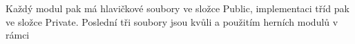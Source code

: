 Každý modul pak má hlavičkové soubory ve složce Public, implementaci tříd pak ve složce Private. Poslední tři soubory jsou kvůli \UBT{} a použitím herních modulů v rámci \UE{}












